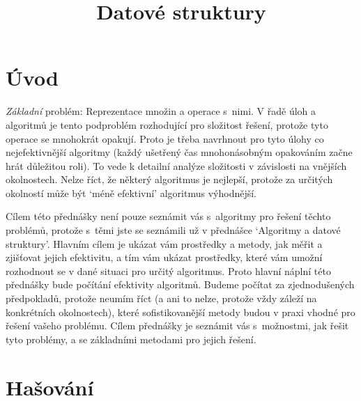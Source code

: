 \documentclass[a4paper,12pt]{article}
\DeclareMathOperator*{\Prob}{Prob}
\begin{document}
     

\newtheorem*{dusledek}{Důsledek}
\newtheorem*{lemma}{Lemma}

\newtheorem{counter}{Counter}
\newtheorem{lemma_counting}[counter]{Lemma}
\newtheorem{dusledek_counting}[counter]{Důsledek}

\newtheorem*{pozorovani}{Pozorování}

\newtheorem*{veta}{Věta}
\newtheorem*{tvrzeni}{Tvrzení}
\newtheorem*{definice}{Definice}


\def \Prob{\operatorname{Prob}}
\def \var{\operatorname{var}}

\title{Datové struktury}
\date{}
\maketitle

\tableofcontents

\section{Úvod}
\emph{Základní} problém: Reprezentace množin a 
operace s~nimi. V řadě úloh a algoritmů je tento 
podproblém rozhodující pro složitost řešení, protože 
tyto operace se mnohokrát opakují. Proto je třeba 
navrhnout pro tyto úlohy co nejefektivnější algoritmy 
(každý ušetřený čas mnohonásobným opakováním začne 
hrát důležitou roli). To vede k detailní 
analýze složitosti v závislosti na vnějších okolnostech. 
Nelze říct, 
že některý algoritmus je nejlepší, protože za určitých 
okolností může být `méně efektivní' algoritmus 
výhodnější.

Cílem této přednášky není pouze seznámit vás s~algoritmy 
pro řešení těchto problémů, protože s~těmi jste se 
seznámili už v přednášce `Algoritmy a datové struktury'. Hlavním cílem 
je ukázat vám prostředky a metody, jak měřit a zjišťovat 
jejich efektivitu, a tím vám ukázat prostřed\-ky, které vám 
umožní rozhodnout se v dané situaci pro určitý algoritmus. 
Proto hlavní náplní této přednášky bude počítání efektivity 
algoritmů. Budeme počítat za 
zjednoduše\-ných 
předpokladů, protože neumím říct (a ani to nelze, protože vždy záleží 
na konkrétních okolnostech), které sofistikovanější metody 
budou v praxi vhodné pro řešení vašeho problému. Cílem přednášky je 
seznámit vás s~možnostmi, jak řešit tyto problémy, a se základními 
metodami pro jejich řešení.
\section{Hašování}
\end{document}
